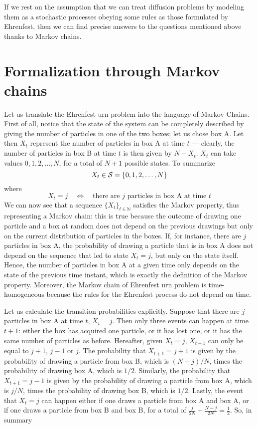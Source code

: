 If we rest on the assumption that we can treat diffusion problems by modeling them as a stochastic processes obeying some rules as those formulated by Ehrenfest, then we can find precise answers to the questions mentioned above thanks to Markov chains.

\section{Formalization through Markov chains}
Let us translate the Ehrenfest urn problem into the language of Markov Chains. 
First of all, notice that the state of the system can be completely described by giving the number of particles in one of the two boxes; let us chose box A. Let then $X_t$ represent the number of particles in box A at time $t$ --- clearly, the number of particles in box B at time $t$ is then given by $N - X_t$. $X_t$ can take values $0, 1, 2, \dots, N$, for a total of $N + 1$ possible states. To summarize
\begin{equation}
    X_t \in \mathcal{S} = \{ 0, 1, 2, \dots, N \}
\end{equation}
where
\begin{equation}
    X_t = j \quad \Leftrightarrow \quad \text{there are $j$ particles in box A at time $t$}
\end{equation}
We can now see that a sequence $\{X_t\}_{t\in \mathbb{N}}$ satisfies the Markov property, thus representing a Markov chain: this is true because the outcome of drawing one particle and a box at random does not depend on the previous drawings but only on the current distribution of particles in the boxes. If, for instance, there are $j$ particles in box A, the probability of drawing a particle that is in box A does not depend on the sequence that led to state $X_t = j$, but only on the state itself. Hence, the number of particles in box A at a given time only depends on the state of the previous time instant, which is exactly the definition of the Markov property. Moreover, the Markov chain of Ehrenfest urn problem is time-homogeneous because the rules for the Ehrenfest process do not depend on time.

Let us calculate the transition probabilities explicitly. Suppose that there are $j$ particles in box A at time $t$, \ie $X_t = j$. Then only three events can happen at time $t+1$: either the box has acquired one particle, or it has lost one, or it has the same number of particles as before. Hereafter, given $X_t = j$, $X_{t+1}$ can only be equal to $j+1$, $j-1$ or $j$. The probability that $X_{t+1} = j+1$ is given by the probability of drawing a particle from box B, which is $(N-j)/N$, times the probability of drawing box A, which is $1/2$. Similarly, the probability that $X_{t+1} = j - 1$ is given by the probability of drawing a particle from box A, which is $j/N$, times the probability of drawing box B, which is $1/2$. Lastly, the event that $X_t = j$ can happen either if one draws a particle from box A and box A, or if one draws a particle from box B and box B, for a total of $\frac{j}{2N} + \frac{N-j}{2N} = \frac{1}{2}$. So, in summary

